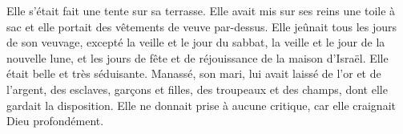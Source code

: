 Elle s’était fait une tente sur sa terrasse.
Elle avait mis sur ses reins une toile à sac
	et elle portait des vêtements de veuve par-dessus.
Elle jeûnait tous les jours de son veuvage, excepté la veille et le jour du sabbat,
	la veille et le jour de la nouvelle lune,
	et les jours de fête et de réjouissance de la maison d’Israël.
Elle était belle et très séduisante.
Manassé, son mari, lui avait laissé de l’or et de l’argent,
	des esclaves, garçons et filles, des troupeaux et des champs,
	dont elle gardait la disposition.
Elle ne donnait prise à aucune critique, car elle craignait Dieu profondément.
